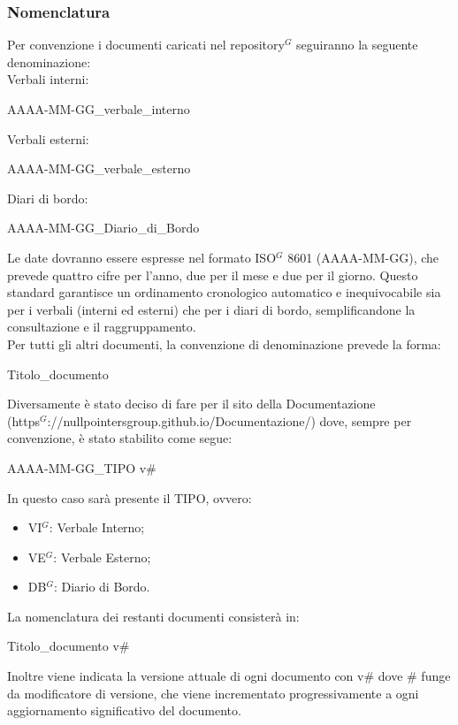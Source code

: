 \subsubsection{Nomenclatura}
Per convenzione i documenti caricati nel repository$^G$ seguiranno la seguente denominazione:\\
Verbali interni:
\begin{center}
    AAAA-MM-GG\_verbale\_interno
\end{center}
Verbali esterni:
\begin{center}
    AAAA-MM-GG\_verbale\_esterno
\end{center}
Diari di bordo:
\begin{center}
    AAAA-MM-GG\_Diario\_di\_Bordo
\end{center}
Le date dovranno essere espresse nel formato ISO$^G$ 8601 (AAAA-MM-GG), che prevede quattro cifre per l'anno, due per il mese e due per il giorno. Questo standard garantisce un ordinamento cronologico automatico e inequivocabile sia per i verbali (interni ed esterni) che per i diari di bordo, semplificandone la consultazione e il raggruppamento.\\
Per tutti gli altri documenti, la convenzione di denominazione prevede la forma:
\begin{center}
    Titolo\_documento
\end{center}
Diversamente è stato deciso di fare per il sito della Documentazione \\
(https$^G$://nullpointersgroup.github.io/Documentazione/) dove, sempre per convenzione, è stato stabilito come segue:
\begin{center}
    AAAA-MM-GG\_TIPO v\#
\end{center}
In questo caso sarà presente il TIPO, ovvero:
\begin{itemize}[itemsep=5pt, parsep=1pt, label=$\scriptstyle\bullet$]
    \item VI$^G$: Verbale Interno;
    \item VE$^G$: Verbale Esterno;
    \item DB$^G$: Diario di Bordo.
\end{itemize}
La nomenclatura dei restanti documenti consisterà in:
\begin{center}
    Titolo\_documento v\#
\end{center}
Inoltre viene indicata la versione attuale di ogni documento con v\# dove \# funge da modificatore di versione, che viene incrementato progressivamente a ogni aggiornamento significativo del documento.

